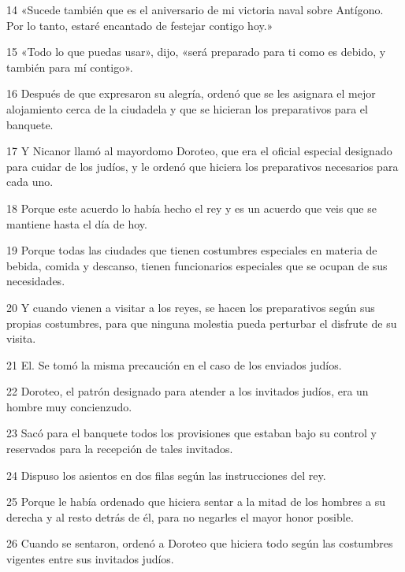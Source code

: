\par 14 «Sucede también que es el aniversario de mi victoria naval sobre Antígono. Por lo tanto, estaré encantado de festejar contigo hoy.»

\par 15 «Todo lo que puedas usar», dijo, «será preparado para ti como es debido, y también para mí contigo».

\par 16 Después de que expresaron su alegría, ordenó que se les asignara el mejor alojamiento cerca de la ciudadela y que se hicieran los preparativos para el banquete.

\par 17 Y Nicanor llamó al mayordomo Doroteo, que era el oficial especial designado para cuidar de los judíos, y le ordenó que hiciera los preparativos necesarios para cada uno.

\par 18 Porque este acuerdo lo había hecho el rey y es un acuerdo que veis que se mantiene hasta el día de hoy.

\par 19 Porque todas las ciudades que tienen costumbres especiales en materia de bebida, comida y descanso, tienen funcionarios especiales que se ocupan de sus necesidades.

\par 20 Y cuando vienen a visitar a los reyes, se hacen los preparativos según sus propias costumbres, para que ninguna molestia pueda perturbar el disfrute de su visita.

\par 21 El. Se tomó la misma precaución en el caso de los enviados judíos.

\par 22 Doroteo, el patrón designado para atender a los invitados judíos, era un hombre muy concienzudo.

\par 23 Sacó para el banquete todos los provisiones que estaban bajo su control y reservados para la recepción de tales invitados.

\par 24 Dispuso los asientos en dos filas según las instrucciones del rey.

\par 25 Porque le había ordenado que hiciera sentar a la mitad de los hombres a su derecha y al resto detrás de él, para no negarles el mayor honor posible.

\par 26 Cuando se sentaron, ordenó a Doroteo que hiciera todo según las costumbres vigentes entre sus invitados judíos.

